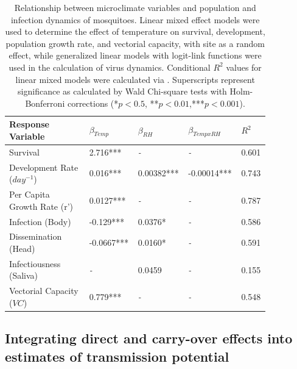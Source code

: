 \documentclass[12pt]{article}
\begin{document}
\begin{table}
\centering
\begin{tabular}{P{0.3\linewidth}P{0.15\linewidth}P{0.15\linewidth}P{0.15\linewidth}P{0.1\linewidth}}
\hline
\textbf{Response Variable} & \textbf{$\beta_{Temp}$}  & \textbf{$\beta_{RH}$} & \textbf{$\beta_{Temp x RH}$} & \textbf{$R^2$}\\
\hline
\hline
Survival & 2.716*** & \textit{-} & \textit{-} & 0.601 \\
Development Rate ($day^{-1}$) & 0.016*** & 0.00382*** & -0.00014*** & 0.743 \\
Per Capita Growth Rate (r')  & 0.0127*** & \textit{-} & \textit{-} & 0.787 \\
\hline
Infection (Body) & -0.129*** & 0.0376* & \textit{-} & 0.586\\
Dissemination (Head) & -0.0667*** & 0.0160* & \textit{-} & 0.591 \\
Infectiousness (Saliva) & \textit{-} & 0.0459 & \textit{-} & 0.155\\
Vectorial Capacity ($VC$) & 0.779*** & \textit{-} & \textit{-} & 0.548\\
\hline
\end{tabular}
\caption{Relationship between microclimate variables and population and infection dynamics of mosquitoes. Linear mixed effect models were used to determine the effect of temperature on survival, development, population growth rate, and vectorial capacity, with site as a random effect, while generalized linear models with logit-link functions were used in the calculation of virus dynamics. Conditional $R^2$ values for linear mixed models were calculated via \citet{nakagawa2013}. Superscripts represent significance as calculated by Wald Chi-square tests with Holm-Bonferroni corrections (*$p<0.5$, **$p<0.01$,***$p<0.001$).}
\label{table:modelResults}
\end{table}

\subsection{Integrating direct and carry-over effects into estimates of transmission potential}
\end{document}
